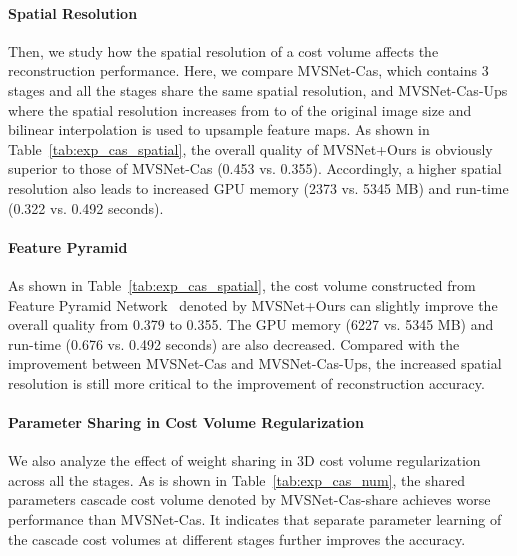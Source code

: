 \documentclass[10pt,twocolumn,letterpaper]{article}
\begin{document}
\paragraph{Spatial Resolution}\vspace{-4mm}
Then, we study how the spatial resolution of a cost volume  affects the reconstruction performance.
Here, we compare MVSNet-Cas,
which contains 3 stages and all the stages share the same spatial resolution,
and MVSNet-Cas-Ups where the spatial resolution increases from  to  of the original image size and bilinear interpolation is used to upsample feature maps.
As shown in Table~\ref{tab:exp_cas_spatial}, the overall quality of MVSNet+Ours is obviously superior to those of MVSNet-Cas (0.453 vs. 0.355).
Accordingly, a higher spatial resolution also leads to increased GPU memory (2373 vs. 5345 MB) and run-time (0.322 vs. 0.492 seconds).

\paragraph{Feature Pyramid}\vspace{-4mm}
As shown in Table~\ref{tab:exp_cas_spatial}, the cost volume constructed from Feature Pyramid Network~\cite{lin2017feature} denoted by MVSNet+Ours can slightly improve the overall quality from 0.379 to 0.355.
The GPU memory (6227 vs. 5345 MB) and run-time (0.676 vs. 0.492 seconds) are also decreased.
Compared with the improvement between MVSNet-Cas and MVSNet-Cas-Ups, the increased spatial resolution is still more critical to the improvement of reconstruction accuracy.


\paragraph{Parameter Sharing in Cost Volume Regularization}\vspace{-4mm}
We also analyze the effect of weight sharing in 3D cost volume regularization across all the stages.
As is shown in Table~\ref{tab:exp_cas_num}, the shared parameters cascade cost volume denoted by MVSNet-Cas-share achieves worse performance than MVSNet-Cas.
It indicates that separate parameter learning of the cascade cost volumes at different stages further improves the accuracy.
\end{document}
